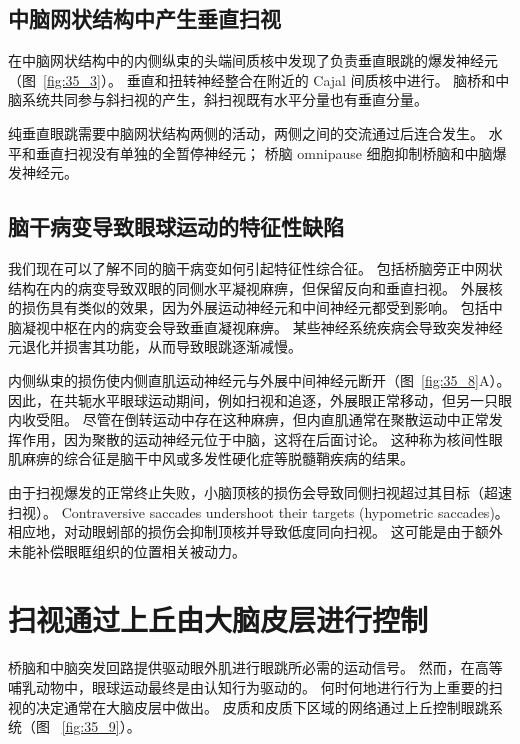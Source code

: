 \subsection{中脑网状结构中产生垂直扫视}

在中脑网状结构中的内侧纵束的头端间质核中发现了负责垂直眼跳的爆发神经元（图~\ref{fig:35_3}）。
垂直和扭转神经整合在附近的 Cajal 间质核中进行。
脑桥和中脑系统共同参与斜扫视的产生，斜扫视既有水平分量也有垂直分量。


纯垂直眼跳需要中脑网状结构两侧的活动，两侧之间的交流通过后连合发生。
水平和垂直扫视没有单独的全暂停神经元；
桥脑 omnipause 细胞抑制桥脑和中脑爆发神经元。



\subsection{脑干病变导致眼球运动的特征性缺陷}

我们现在可以了解不同的脑干病变如何引起特征性综合征。
包括桥脑旁正中网状结构在内的病变导致双眼的同侧水平凝视麻痹，但保留反向和垂直扫视。
外展核的损伤具有类似的效果，因为外展运动神经元和中间神经元都受到影响。
包括中脑凝视中枢在内的病变会导致垂直凝视麻痹。
某些神经系统疾病会导致突发神经元退化并损害其功能，从而导致眼跳逐渐减慢。


内侧纵束的损伤使内侧直肌运动神经元与外展中间神经元断开（图~\ref{fig:35_8}A）。
因此，在共轭水平眼球运动期间，例如扫视和追逐，外展眼正常移动，但另一只眼内收受阻。
尽管在倒转运动中存在这种麻痹，但内直肌通常在聚散运动中正常发挥作用，因为聚散的运动神经元位于中脑，这将在后面讨论。
这种称为核间性眼肌麻痹的综合征是脑干中风或多发性硬化症等脱髓鞘疾病的结果。


由于扫视爆发的正常终止失败，小脑顶核的损伤会导致同侧扫视超过其目标（超速扫视）。
Contraversive saccades undershoot their targets (hypometric saccades)。
相应地，对动眼蚓部的损伤会抑制顶核并导致低度同向扫视。
这可能是由于额外未能补偿眼眶组织的位置相关被动力。



\section{扫视通过上丘由大脑皮层进行控制}

桥脑和中脑突发回路提供驱动眼外肌进行眼跳所必需的运动信号。
然而，在高等哺乳动物中，眼球运动最终是由认知行为驱动的。
何时何地进行行为上重要的扫视的决定通常在大脑皮层中做出。
皮质和皮质下区域的网络通过上丘控制眼跳系统（图 ~\ref{fig:35_9}）。


